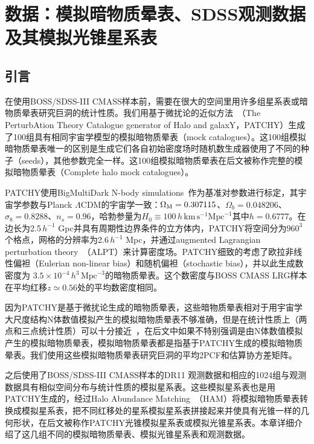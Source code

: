 \chapter{数据：模拟暗物质晕表、SDSS观测数据及其模拟光锥星系表}
\label{cha:data}

\section{引言}

在使用BOSS/SDSS-III CMASS样本前，需要在很大的空间里用许多组星系表或暗物质晕表研究巨洞的统计性质。我们用基于微扰论的近似方法~\cite{Kitaura2014,Kitaura2015}（The PerturbAtion Theory Catalogue generator of Halo and galaxY，\textsc{PATCHY}）生成了100组具有相同宇宙学模型的模拟暗物质晕表（mock catalogues）。这100组模拟暗物质晕表唯一的区别是生成它们各自初始密度场时随机数生成器使用了不同的种子（seeds），其他参数完全一样。这100组模拟暗物质晕表在后文被称作完整的模拟暗物质晕表（Complete halo mock catalogues）。

\textsc{PATCHY}使用BigMultiDark N-body simulations~\cite{Klypin2014}作为基准对参数进行标定，其宇宙学参数与Planck $\Lambda$CDM的宇宙学一致：$\Omega_{\rm M} = 0.307115$、$\Omega_b = 0.048206$、$\sigma_8 = 0.8288$、$n_s = 0.96$，哈勃参量为$H_0 \equiv 100\,h\,\mathrm{km}\,\mathrm{s}^{-1}\mathrm{Mpc}^{-1}$其中$h = 0.6777$。在边长为2.5\,$h^{-1}$ Gpc并具有周期性边界条件的立方体内，\textsc{PATCHY}将空间分为$960^3$个格点，网格的分辨率为2.6\,$h^{-1}$ Mpc，并通过augmented Lagrangian perturbation theory~\cite{Kitaura2013}（ALPT）来计算密度场。\textsc{PATCHY}细致的考虑了欧拉非线性偏袒（Eulerian non-linear bias）和随机偏袒（stochastic bias），并以此生成数密度为 $3.5\times10^{-4}\,h^3\,\mathrm{Mpc}^{-3}$的暗物质晕表。这个数密度与BOSS CMASS LRG样本在平均红移$z \simeq 0.56$处的平均数密度相同。

因为\textsc{PATCHY}是基于微扰论生成的暗物质晕表，这些暗物质晕表相对于用宇宙学大尺度结构N体数值模拟产生的模拟暗物质晕表不够准确，但是在统计性质上（两点和三点统计性质）可以十分接近~\cite{Chuang2015,Zhaocheng2015}，在后文中如果不特别强调是由N体数值模拟产生的模拟暗物质晕表，模拟暗物质晕表都是指基于\textsc{PATCHY}生成的模拟暗物质晕表。我们使用这些模拟暗物质晕表研究巨洞的平均2PCF和估算协方差矩阵。

之后使用了BOSS/SDSS-III CMASS样本的DR11
观测数据和相应的1024组与观测数据具有相似空间分布与统计性质的模拟星系表。这些模拟星系表也是用\textsc{PATCHY}生成的，经过Halo Abundance Matching~\cite{Rodriguez-Torres2016}（HAM）将模拟暗物质晕表转换成模拟星系表，把不同红移处的星系模拟星系表拼接起来并使具有光锥一样的几何形状，在后文被称作\textsc{PATCHY}光锥模拟星系表或模拟光锥星系表。本章详细介绍了这几组不同的模拟暗物质晕表、模拟光锥星系表和观测数据。

